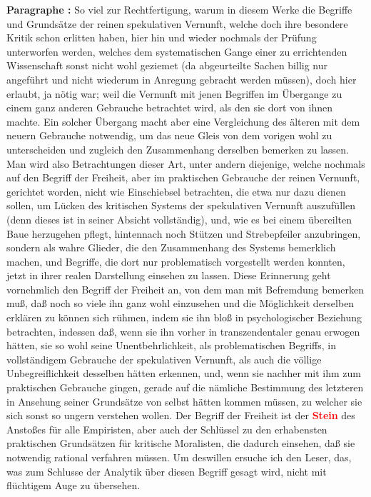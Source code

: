 \documentclass[a4paper,12pt,twoside]{book}
\newcommand{\match}[1]{\textcolor{red}{\textbf{#1}}}
\begin{document}
	\textbf{Paragraphe : }So viel zur Rechtfertigung, warum in diesem Werke die Begriffe und Grundsätze der reinen spekulativen Vernunft, welche doch ihre besondere Kritik schon erlitten haben, hier hin und wieder nochmals der Prüfung unterworfen werden, welches dem systematischen Gange einer zu errichtenden Wissenschaft sonst nicht wohl geziemet (da abgeurteilte Sachen billig nur angeführt und nicht wiederum in Anregung gebracht werden müssen), doch hier erlaubt, ja nötig war; weil die Vernunft mit jenen Begriffen im Übergange zu einem ganz anderen Gebrauche betrachtet wird, als den sie dort von ihnen machte. Ein solcher Übergang macht aber eine Vergleichung des älteren mit dem neuern Gebrauche notwendig, um das neue Gleis von dem vorigen wohl zu unterscheiden und zugleich den Zusammenhang derselben bemerken zu lassen. Man wird also Betrachtungen dieser Art, unter andern diejenige, welche nochmals auf den Begriff der Freiheit, aber im praktischen Gebrauche der reinen Vernunft, gerichtet worden, nicht wie Einschiebsel betrachten,  die etwa nur dazu dienen sollen, um Lücken des kritischen Systems der spekulativen Vernunft auszufüllen (denn dieses ist in seiner Absicht vollständig), und, wie es bei einem übereilten Baue herzugehen pflegt, hintennach noch Stützen und Strebepfeiler anzubringen, sondern als wahre Glieder, die den Zusammenhang des Systems bemerklich machen, und Begriffe, die dort nur problematisch vorgestellt werden konnten, jetzt in ihrer realen Darstellung einsehen zu lassen. Diese Erinnerung geht vornehmlich den Begriff der Freiheit an, von dem man mit Befremdung bemerken muß, daß noch so viele ihn ganz wohl einzusehen und die Möglichkeit derselben erklären zu können sich rühmen, indem sie ihn bloß in psychologischer Beziehung betrachten, indessen daß, wenn sie ihn vorher in transzendentaler genau erwogen hätten, sie so wohl seine Unentbehrlichkeit, als problematischen Begriffs, in vollständigem Gebrauche der spekulativen Vernunft, als auch die völlige Unbegreiflichkeit desselben hätten erkennen, und, wenn sie nachher mit ihm zum praktischen Gebrauche gingen, gerade auf die nämliche Bestimmung des letzteren in Ansehung seiner Grundsätze von selbst hätten kommen müssen, zu welcher sie sich sonst so ungern verstehen wollen. Der Begriff der Freiheit ist der \match{Stein} des Anstoßes für alle Empiristen, aber auch der Schlüssel zu den erhabensten praktischen Grundsätzen für kritische Moralisten, die dadurch einsehen, daß sie notwendig rational verfahren müssen. Um deswillen ersuche ich den Leser, das, was zum Schlusse der Analytik über diesen Begriff gesagt wird, nicht mit flüchtigem Auge zu übersehen. 
	
\end{document}
